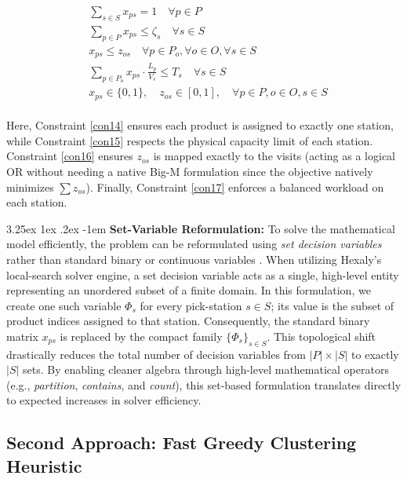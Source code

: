 \documentclass[preprint,review,11pt,authoryear]{elsarticle}
\makeatletter
\renewcommand\paragraph{\@startsection{paragraph}{4}{\z@}
  {3.25ex \@plus1ex \@minus.2ex}
  {-1em}
  {\normalfont\normalsize\itshape}}
\makeatother
\begin{document}
\begin{align}
&\sum_{s \in S} x_{ps} = 1 \quad \forall p \in P \label{con14}\\
&\sum_{p \in P} x_{ps} \leq \zeta_s \quad \forall s \in S \label{con15}\\
&x_{ps} \leq z_{os} \quad \forall p \in P_o, \forall o \in O, \forall s \in S \label{con16}\\
&\sum_{p \in P_o} x_{ps} \cdot \frac{L_p}{V_s} \leq T_s \quad \forall s \in S \label{con17}\\
&x_{ps} \in \{0, 1\}, \quad z_{os} \in [0,1], \quad \forall p \in P, o \in O, s \in S 
\end{align}
\\
\noindent Here, Constraint \eqref{con14} ensures each product is assigned to exactly one station, while Constraint \eqref{con15} respects the physical capacity limit of each station. Constraint \eqref{con16} ensures $z_{os}$ is mapped exactly to the visits (acting as a logical OR without needing a native Big-M formulation since the objective natively minimizes $\sum z_{os}$). Finally, Constraint \eqref{con17} enforces a balanced workload on each station.

\paragraph{\textbf{Set-Variable Reformulation: }} 
To solve the mathematical model efficiently, the problem can be reformulated using \emph{set decision variables} rather than standard binary or continuous variables \cite{blaisemodeling}. When utilizing Hexaly's local-search solver engine, a set decision variable acts as a single, high-level entity representing an unordered subset of a finite domain. In this formulation, we create one such variable \( \Phi_s \) for every pick-station $s \in S$; its value is the subset of product indices assigned to that station. Consequently, the standard binary matrix $x_{ps}$ is replaced by the compact family \( \{\Phi_s\}_{s \in S} \). This topological shift drastically reduces the total number of decision variables from $|P| \times |S|$ to exactly $|S|$ sets. By enabling cleaner algebra through high-level mathematical operators (e.g., \textit{partition}, \textit{contains}, and \textit{count}), this set-based formulation translates directly to expected increases in solver efficiency.

\subsection{Second Approach: Fast Greedy Clustering Heuristic}
\label{sec:heuristic_clustering}
\end{document}
